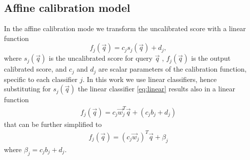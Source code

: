    \subsection{Affine calibration model}
   In the affine calibration mode we transform the uncalibrated score with a linear function 
     \begin{equation}
       f_j(\vec{q}) = c_j s_j(\vec{q}) + d_j,
       \label{eq:affine}
     \end{equation}
	where $s_j(\vec{q})$ is the uncalibrated score for query $\vec{q}$ , $ f_j(\vec{q})$ is the output calibrated score, and
	$c_j$ and $d_j$ are scalar parameters of the calibration function, specific to each classifier $j$.
	In this work we use linear classifiers, hence substituting for $s_j(\vec{q})$ the linear classifier \eqref{eq:linear} results also in a linear function
     \begin{align}
         f_j(\vec{q}) = c_j\vec{w}_j^T \vec{q}+ (c_j b_j+d_j)
    \end{align}
    that can be further simplified to
    \begin{align}
        f_j(\vec{q}) = (c_j\vec{w}_j)^T \vec{q} + \beta_j
     \end{align}
    where $\beta_j=c_j b_j+d_j$.

